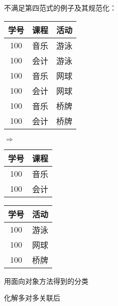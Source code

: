 \documentclass[compress]{beamer}
\begin{document}
\begin{frame}
{    不满足第四范式的例子及其规范化：\\[2ex]

    \small

    \begin{tabular}{|c|c|c|}
      \hline
      学号 & 课程 & 活动 \\ \hline \hline
     100 & 音乐 & 游泳 \\ \hline
     100 & 会计 & 游泳 \\ \hline
     100 & 音乐 & 网球 \\ \hline
     100 & 会计 & 网球 \\ \hline
     100 & 音乐 & 桥牌 \\ \hline
     100 & 会计 & 桥牌 \\ \hline
  \end{tabular}%
}
   {
  {\hspace*{2ex}$\Rightarrow$\hspace*{2ex}}
    \begin{tabular}{|c|c|}
      \hline
      学号 & 课程 \\ \hline \hline
     100 & 音乐 \\ \hline
     100 & 会计 \\ \hline
  \end{tabular}%
  \hspace*{2ex}  \begin{tabular}{|c|c|}
      \hline
      学号 & 活动 \\ \hline \hline
     100 & 游泳 \\ \hline
     100 & 网球 \\ \hline
     100 & 桥牌 \\ \hline
  \end{tabular}%
  }

   {
    用面向对象方法得到的分类 \\[2ex]

    化解多对多关联后 \\[2ex]
  \noindent{}}
\end{frame}
\end{document}
